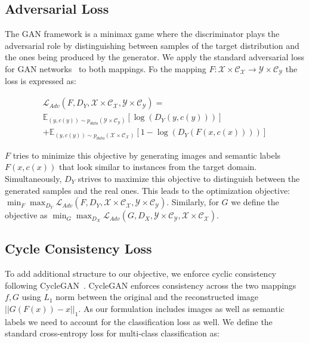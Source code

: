 \subsection{Adversarial Loss}\label{subsec:advloss}
The GAN framework is a minimax game where the discriminator plays the adversarial role by distinguishing between samples of the target distribution and the ones being produced by the generator. We apply the standard adversarial loss for GAN networks~\cite{goodfellow_generative_2014} to both mappings. Fo the mapping $F:\mathcal{ X \times C_X} \to \mathcal{ Y \times C_Y}$ the loss is expressed as:

\begin{equation}
\begin{aligned}
\mathcal{L}_{Adv}(F, D_Y, \mathcal{ X \times C_X}, \mathcal{ Y \times C_Y}) =\\ \mathbb{E}_{\left(y,c(y)\right) \sim p_{data}\left(\mathcal{ Y \times C_Y}\right)}[\log(D_Y(y,c(y)))] \\ 
+ \mathbb{E}_{\left(y,c(y)\right) \sim p_{data}\left(\mathcal{ X \times C_X}\right)} [1-\log(D_Y(F(x,c(x))))]
\end{aligned}
\label{eq:lossadv}
\end{equation}

$F$ tries to minimize this objective by generating images and semantic labels $F(x,c(x))$ that look similar to instances from the target domain. Simultaneously, $D_Y$ strives to maximize this objective to distinguish between the generated samples and the real ones. This leads to the optimization objective:  
$\min_F \max_{D_Y} \mathcal{L}_{Adv}(F, D_Y, \mathcal{X \times C_X}, \mathcal{Y \times C_Y})$. 
Similarly, for $G$ we define the objective as $\min_G \max_{D_X} \mathcal{L}_{Adv}(G, D_X, \mathcal{Y \times C_Y}, \mathcal{X \times C_X})$. 

\subsection{Cycle Consistency Loss}\label{subsec:cycleloss}
To add additional structure to our objective, we enforce cyclic consistency following CycleGAN~\cite{zhu_unpaired_2017}. CycleGAN enforces consistency across the two mappings $f,G$ using $L_1$ norm between the original and the reconstructed image $||G(F(x)) - x||_1$. As our formulation includes images as well as semantic labels we need to account for the classification loss as well. We define the standard cross-entropy loss for multi-class classification as:

